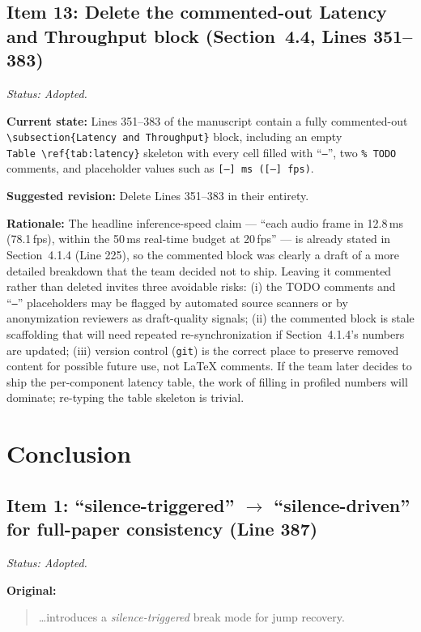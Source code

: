 \documentclass{article}
\begin{document}
\subsection*{Item 13: Delete the commented-out Latency and Throughput block (Section~4.4, Lines 351--383)}

\textit{Status: Adopted.}

\textbf{Current state:}
Lines 351--383 of the manuscript contain a fully commented-out \texttt{\textbackslash subsection\{Latency and Throughput\}} block, including an empty \texttt{Table~\textbackslash ref\{tab:latency\}} skeleton with every cell filled with ``\texttt{--}'', two \texttt{\% TODO} comments, and placeholder values such as \texttt{[--]\,ms ([--]\,fps)}.

\textbf{Suggested revision:}
Delete Lines 351--383 in their entirety.

\textbf{Rationale:}
The headline inference-speed claim --- ``each audio frame in 12.8\,ms (78.1\,fps), within the 50\,ms real-time budget at 20\,fps'' --- is already stated in Section~4.1.4 (Line 225), so the commented block was clearly a draft of a more detailed breakdown that the team decided not to ship. Leaving it commented rather than deleted invites three avoidable risks: (i) the TODO comments and ``\texttt{--}'' placeholders may be flagged by automated source scanners or by anonymization reviewers as draft-quality signals; (ii) the commented block is stale scaffolding that will need repeated re-synchronization if Section~4.1.4's numbers are updated; (iii) version control (\texttt{git}) is the correct place to preserve removed content for possible future use, not LaTeX comments. If the team later decides to ship the per-component latency table, the work of filling in profiled numbers will dominate; re-typing the table skeleton is trivial.


\section*{Conclusion}

\subsection*{Item 1: ``silence-triggered'' $\to$ ``silence-driven'' for full-paper consistency (Line 387)}

\textit{Status: Adopted.}

\textbf{Original:}
\begin{quote}
\ldots introduces a \emph{silence-triggered} break mode for jump recovery.
\end{quote}
\end{document}

